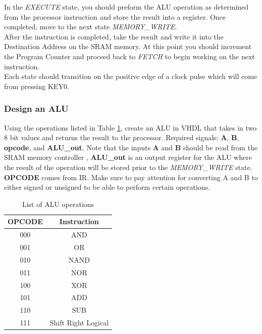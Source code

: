 In the \emph{EXECUTE} state, you should preform the ALU operation as determined from the processor instruction and store the result into a register. Once completed,  move to the next state \emph{MEMORY\_WRITE}. \\

After the instruction is completed, take the result and write it into the Destination Address on the SRAM memory. At this point you should increment the Program Counter and proceed back to \emph{FETCH} to begin working on the next instruction. \\

Each state should transition on the positive edge of a clock pulse which will come from pressing KEY0.

\subsubsection{Design an ALU}
Using the operations listed in Table \ref{tab:aluop}, create an ALU in VHDL that takes in two 8 bit values and returns the result to the processor. Required signals: {\bf A}, {\bf B}, {\bf opcode}, and {\bf ALU\_out}. Note that the inputs {\bf A} and {\bf B} should be read from the SRAM memory controller ,  {\bf ALU\_out} is an output register for the ALU  where the result of the operation will be stored prior to the \emph{MEMORY\_WRITE} state. {\bf OPCODE} comes from IR. Make sure to pay attention for converting A and B to either signed or unsigned to be able to perform certain operations.

\begin {table}[H]
	\caption {List of ALU operations} 
	\label{tab:aluop} 
	\begin{center}
    		\begin{tabular}{ | c | c |}
			\hline
 			{\bf OPCODE} & {\bf Instruction} \\ \hline
			000 & AND \\ \hline
			001 & OR \\ \hline
			010 & NAND \\ \hline
			011 & NOR \\ \hline
			100 & XOR \\ \hline
			101 & ADD \\ \hline
			110 & SUB \\ \hline
			111 & Shift Right Logical \\
			\hline
    		\end{tabular}
	\end{center}
\end{table}

